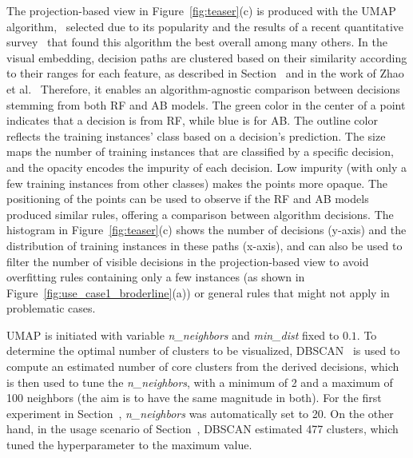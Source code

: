 The projection-based view in Figure~\ref{fig:teaser}(c) is produced with the UMAP algorithm,~\cite{McInnes2018UMAP} selected due to its popularity and the results of a recent quantitative survey~\cite{Espadoto2021Toward} that found this algorithm the best overall among many others. In the visual embedding, decision paths are clustered based on their similarity according to their ranges for each feature, as described in Section~ and in the work of Zhao et al.~\cite{Zhao2019iForest} Therefore, it enables an algorithm-agnostic comparison between decisions stemming from both RF and AB models.
The green color in the center of a point indicates that a decision is from RF, while blue is for AB. The outline color reflects the training instances' class based on a decision's prediction. The size maps the number of training instances that are classified by a specific decision, and the opacity encodes the impurity of each decision. Low impurity (with only a few training instances from other classes) makes the points more opaque. The positioning of the points can be used to observe if the RF and AB models produced similar rules, offering a comparison between algorithm decisions. The histogram in Figure~\ref{fig:teaser}(c) shows the number of decisions (y-axis) and the distribution of training instances in these paths (x-axis), and can also be used to filter the number of visible decisions in the projection-based view to avoid overfitting rules containing only a few instances (as shown in Figure~\ref{fig:use_case1_broderline}(a)) or general rules that might not apply in problematic cases.

UMAP is initiated with variable \emph{n\_neighbors} and \emph{min\_dist} fixed to $0.1$. To determine the optimal number of clusters to be visualized, DBSCAN~\cite{Ester1996A} is used to compute an estimated number of core clusters from the derived decisions, which is then used to tune the \emph{n\_neighbors}, with a minimum of 2 and a maximum of 100 neighbors (the aim is to have the same magnitude in both). For the first experiment in Section~, \emph{n\_neighbors} was automatically set to 20. On the other hand, in the usage scenario of Section~, DBSCAN estimated 477 clusters, which tuned the hyperparameter to the maximum value.

